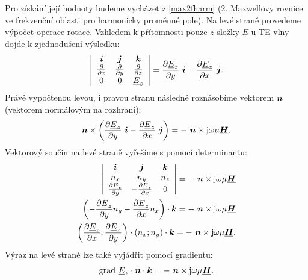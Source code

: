 \documentclass[12pt,a4paper,oneside]{article}
\numberwithin{equation}{section} %
\numberwithin{figure}{section} %
\numberwithin{table}{section} %
\newcommand{\mj}{\mathrm{j}} %
\renewcommand{\vec}[1]{\mbox{\boldmath$#1$}} %
\newcommand{\faz}[1]{{\underline{#1}}} %
\newcommand{\grad}{\mathrm{grad}\ }
\begin{document}
Pro získání její hodnoty budeme vycházet z \ref{max2fharm} (2. Maxwellovy rovnice ve frekvenční oblasti pro harmonicky proměnné pole). Na levé straně provedeme výpočet operace rotace. Vzhledem k přítomnosti pouze $z$ složky $E$ u TE vlny dojde k zjednodušení výsledku:
\begin{equation}
\left| 
\begin{array}{c c c}
\vec{i} & \vec{j} & \vec{k} \\ 
\frac{\partial}{\partial x} & \frac{\partial}{\partial y} & \frac{\partial}{\partial z} \\
0 & 0 & \faz{E}_z
\end{array}
\right|
= \frac{\partial \faz{E}_z}{\partial y} ~ \vec{i} - \frac{\partial \faz{E}_z}{\partial x} ~ \vec{j}  .
\end{equation} 
Právě vypočtenou levou, i pravou stranu následně roznásobíme vektorem $\vec{n}$ (vektorem normálovým na rozhraní):
\begin{equation}
\vec{n} \times \left( \frac{\partial \faz{E}_z}{\partial y} ~ \vec{i} - \frac{\partial \faz{E}_z}{\partial x} ~ \vec{j} \right) = - ~ \vec{n} \times \mj \omega \mu \faz{\vec{H}} .
\end{equation}
Vektorový součin na levé straně vyřešíme s pomocí determinantu:
\begin{subequations}
\begin{align}
\left| 
\begin{array}{c c c}
\vec{i} & \vec{j} & \vec{k} \\ 
n_x & n_y & n_z \\
\frac{\partial \faz{E}_z}{\partial y} & - \frac{\partial \faz{E}_z}{\partial x} & 0
\end{array}
\right|
= - ~ \vec{n} \times \mj \omega \mu \faz{\vec{H}} 
\\
\left( - \frac{\partial \faz{E}_z}{\partial y} n_y - \frac{\partial \faz{E}_z}{\partial x} n_x \right) \cdot \vec{k} = - ~ \vec{n} \times \mj \omega \mu \faz{\vec{H}}
\\
\left( \frac{\partial \faz{E}_z}{\partial x} ; \frac{\partial \faz{E}_z}{\partial y} \right) \cdot \left( n_x; n_y \right) \cdot \vec{k} = - ~ \vec{n} \times \mj \omega \mu \faz{\vec{H}} .
\end{align}
\end{subequations}
Výraz na levé straně lze také vyjádřit pomocí gradientu:
\begin{equation}
\grad \faz{E}_z \cdot \vec{n} \cdot \vec{k} = - ~ \vec{n} \times \mj \omega \mu \faz{\vec{H}} .
\end{equation}
\end{document}
